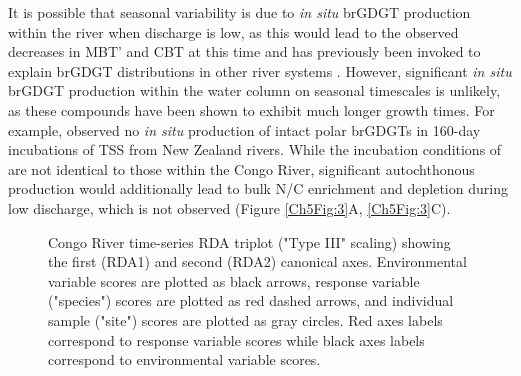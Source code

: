 It is possible that seasonal variability is due to \textit{in situ} brGDGT production within the river when discharge is low, as this would lead to the observed decreases in MBT' and CBT at this time \citep{Peterse:2009hl,Tierney:2010br} and has previously been invoked to explain brGDGT distributions in other river systems \citep{DeJonge:2014fs,Zell:2014gt}. However, significant \textit{in situ} brGDGT production within the water column on seasonal timescales is unlikely, as these compounds have been shown to exhibit much longer growth times. For example, \citet{Peterse:2015ef} observed no \textit{in situ} production of intact polar brGDGTs in 160-day incubations of TSS from New Zealand rivers. While the incubation conditions of \citet{Peterse:2015ef} are not identical to those within the Congo River, significant autochthonous production would additionally lead to bulk N/C enrichment and  depletion during low discharge, which is not observed (Figure \ref{Ch5Fig:3}A, \ref{Ch5Fig:3}C).

\begin{figure}[ht ]
	\caption[Environmental parameter, bulk metrics, and GDGT distribution RDA analysis]{Congo River time-series RDA triplot ("Type III" scaling) showing the first (RDA1) and second (RDA2) canonical axes. Environmental variable scores are plotted as black arrows, response variable ("species") scores are plotted as red dashed arrows, and individual sample ("site") scores are plotted as gray circles. Red axes labels correspond to response variable scores while black axes labels correspond to environmental variable scores.}
	\label{Ch5Fig:8} 
\end{figure}

